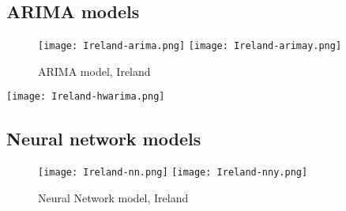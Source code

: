 \subsection{ARIMA models}

\begin{figure}[!htb]
  \texttt{[image: Ireland-arima.png]} \label{fig:ireland-arima}
\endminipage\hfill
{}
  \texttt{[image: Ireland-arimay.png]} \label{fig:ireland-arimay}
\endminipage
\caption{ARIMA model, Ireland}
\end{figure}

\texttt{[image: Ireland-hwarima.png]}


\subsection{Neural network models}

\begin{figure}[!htb]
  \texttt{[image: Ireland-nn.png]} \label{fig:ireland-nn}
\endminipage\hfill
{}
  \texttt{[image: Ireland-nny.png]} \label{fig:ireland-nny}
\endminipage
\caption{Neural Network model, Ireland}
\end{figure}
